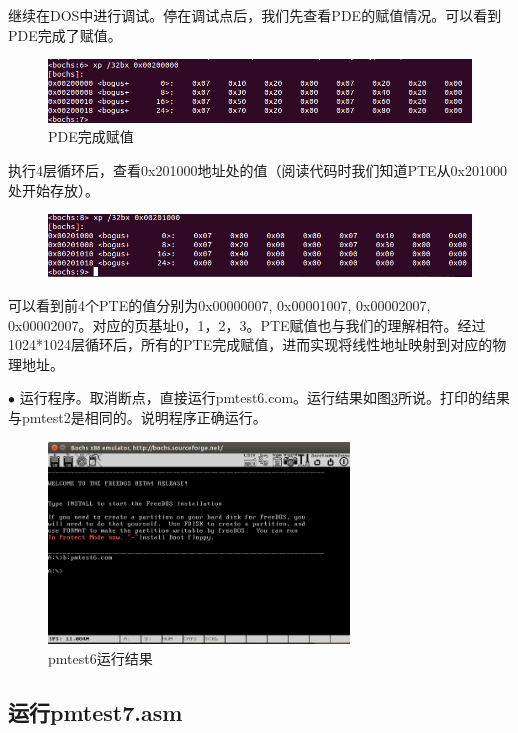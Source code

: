 \documentclass[UTF8,12pt]{ctexart}
\begin{document}
    继续在DOS中进行调试。停在调试点后，我们先查看PDE的赋值情况。可以看到PDE完成了赋值。
    \begin{figure}[H]
        \centering
        \includegraphics[width=12cm]{images/finish_PDE.png}
        \caption{PDE完成赋值}
        \label{finish_PDE}
    \end{figure}
    
    执行4层循环后，查看0x201000地址处的值（阅读代码时我们知道PTE从0x201000处开始存放）。
    
    \begin{figure}[H]
        \centering
        \includegraphics[width=12cm]{images/debug2_ans.png}
        \label{debug2_ans}
    \end{figure}
    可以看到前4个PTE的值分别为0x00000007, 0x00001007, 0x00002007, 0x00002007。对应的页基址0，1，2，3。PTE赋值也与我们的理解相符。经过1024*1024层循环后，所有的PTE完成赋值，进而实现将线性地址映射到对应的物理地址。
    
    $\bullet$ 运行程序。取消断点，直接运行pmtest6.com。运行结果如图\ref{result6}所说。打印的结果与pmtest2是相同的。说明程序正确运行。
    \begin{figure}[H]
        \centering
        \includegraphics[width=8cm]{images/pmtest6_result.png}
        \caption{pmtest6运行结果}
        \label{result6}
    \end{figure}
    
    \subsection{运行pmtest7.asm\label{运行pmtest7}}
\end{document}
